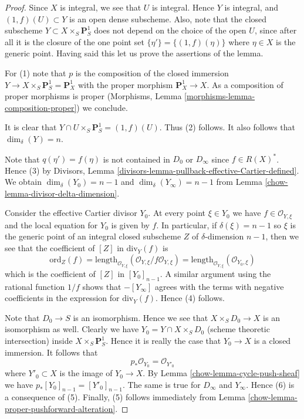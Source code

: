 \begin{proof}

Since $X$ is integral, we see that $U$ is integral.
Hence $Y$ is integral, and $(1, f)(U) \subset Y$ is an open dense subscheme.
Also, note that the closed subscheme $Y \subset X \times_S \mathbf{P}^1_S$
does not depend on the choice of the open $U$, since after all it is
the closure of the one point set $\{\eta'\} = \{(1, f)(\eta)\}$
where $\eta \in X$ is the generic point. Having said this let us
prove the assertions of the lemma.

\medskip\noindent
For (1) note that $p$ is the composition of the closed immersion
$Y \to X \times_S \mathbf{P}^1_S = \mathbf{P}^1_X$ with the proper
morphism $\mathbf{P}^1_X \to X$. As a composition of proper morphisms
is proper (Morphisms, Lemma \ref{morphisms-lemma-composition-proper})
we conclude.

\medskip\noindent
It is clear that $Y \cap U \times_S \mathbf{P}^1_S = (1, f)(U)$.
Thus (2) follows. It also follows that $\dim_\delta(Y) = n$.

\medskip\noindent
Note that $q(\eta') = f(\eta)$ is not contained in $D_0$ or $D_\infty$
since $f \in R(X)^*$. Hence (3) by
Divisors, Lemma \ref{divisors-lemma-pullback-effective-Cartier-defined}.
We obtain $\dim_\delta(Y_0) = n - 1$
and $\dim_\delta(Y_\infty) = n - 1$ from
Lemma \ref{chow-lemma-divisor-delta-dimension}.

\medskip\noindent
Consider the effective Cartier divisor $Y_0$.
At every point $\xi \in Y_0$ we have $f \in \mathcal{O}_{Y, \xi}$ and
the local equation for $Y_0$ is given by $f$.
In particular, if $\delta(\xi) = n - 1$ so $\xi$ is the generic point
of an integral closed subscheme $Z$ of $\delta$-dimension $n - 1$,
then we see that the coefficient of $[Z]$ in $\text{div}_Y(f)$ is
$$
\text{ord}_Z(f) =
\text{length}_{\mathcal{O}_{Y, \xi}}
(\mathcal{O}_{Y, \xi}/f\mathcal{O}_{Y, \xi}) =
\text{length}_{\mathcal{O}_{Y, \xi}}
(\mathcal{O}_{Y_0, \xi})
$$
which is the coefficient of $[Z]$ in $[Y_0]_{n - 1}$. A similar
argument using the rational function $1/f$ shows that
$-[Y_\infty]$ agrees with the terms with negative coefficients in
the expression for $\text{div}_Y(f)$. Hence (4) follows.

\medskip\noindent
Note that $D_0 \to S$ is an isomorphism. Hence we see that
$X \times_S D_0 \to X$ is an isomorphism as well. Clearly
we have $Y_0 = Y \cap X \times_S D_0$ (scheme theoretic intersection)
inside $X \times_S \mathbf{P}^1_S$. Hence it is really the case that
$Y_0 \to X$ is a closed immersion. It follows that
$$
p_*\mathcal{O}_{Y_0} = \mathcal{O}_{Y'_0}
$$
where $Y'_0 \subset X$ is the image of $Y_0 \to X$.
By Lemma \ref{chow-lemma-cycle-push-sheaf} we
have $p_*[Y_0]_{n - 1} = [Y'_0]_{n - 1}$. The same
is true for $D_\infty$ and $Y_\infty$. Hence (6) is a consequence of (5).
Finally, (5) follows immediately from
Lemma \ref{chow-lemma-proper-pushforward-alteration}.
\end{proof}

